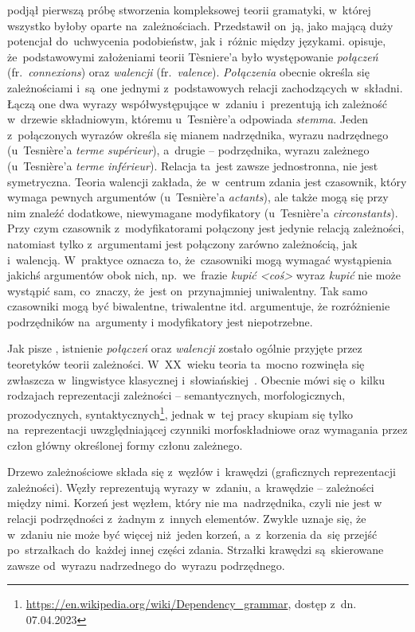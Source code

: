 \documentclass[licencjacka]{pracamgr_Kogni}
\begin{document}
    \citet{Tesniere1959} podjął pierwszą próbę stworzenia kompleksowej teorii gramatyki, w~której wszystko byłoby oparte na~zależnościach.
    Przedstawił on~ją, jako mającą duży potencjał do~uchwycenia podobieństw, jak i~różnic między językami. \citet{Wroblewska2014} opisuje, że~podstawowymi założeniami teorii Tèsniere’a było występowanie \textit{połączeń} (fr.~\textit{connexions}) oraz \textit{walencji} (fr.~\textit{valence}). \textit{Połączenia} obecnie określa się zależnościami i~są~one jednymi z~podstawowych relacji zachodzących w~składni.
    Łączą one dwa wyrazy współwystępujące w~zdaniu i~prezentują ich zależność w~drzewie składniowym, któremu u~Tesnière’a odpowiada \textit{stemma}.
    Jeden z~połączonych wyrazów określa się mianem nadrzędnika, wyrazu nadrzędnego (u~Tesnière’a \textit{terme supérieur}), a~drugie -- podrzędnika, wyrazu zależnego (u~Tesnière’a \textit{terme inférieur}). Relacja ta~jest zawsze jednostronna, nie jest symetryczna.
    Teoria walencji zakłada, że~w~centrum zdania jest czasownik, który wymaga pewnych argumentów (u~Tesnière’a \textit{actants}), ale także mogą się przy nim znaleźć dodatkowe, niewymagane modyfikatory (u~Tesnière’a \textit{circonstants}). Przy czym czasownik z~modyfikatorami połączony jest jedynie relacją zależności, natomiast tylko z~argumentami jest połączony zarówno zależnością, jak i~walencją.
    W~praktyce oznacza to, że~czasowniki mogą wymagać wystąpienia jakichś argumentów obok nich, np.~we~frazie \textit{kupić <coś>} wyraz \textit{kupić} nie może wystąpić sam, co~znaczy, że~jest on~przynajmniej uniwalentny.
    Tak samo czasowniki mogą być biwalentne, triwalentne itd. \citet{Przepiorkowski2017} argumentuje, że rozróżnienie podrzędników na~argumenty i modyfikatory jest niepotrzebne.

    Jak pisze \citet{Wroblewska2014}, istnienie \textit{połączeń} oraz \textit{walencji} zostało ogólnie przyjęte przez teoretyków teorii zależności.
    W~XX~wieku teoria ta~mocno rozwinęła się zwłaszcza w~lingwistyce klasycznej i~słowiańskiej~\citep{Melcuk1988}.
    Obecnie mówi się o~kilku rodzajach reprezentacji zależności -- semantycznych, morfologicznych, prozodycznych, syntaktycznych\footnote{\url{https://en.wikipedia.org/wiki/Dependency_grammar}, dostęp z~dn. 07.04.2023}, jednak w~tej pracy skupiam się tylko na~reprezentacji uwzględniającej czynniki morfoskładniowe oraz wymagania przez człon główny określonej formy członu zależnego.

    Drzewo zależnościowe składa się z~węzłów i~krawędzi (graficznych reprezentacji zależności).
    Węzły reprezentują wyrazy w~zdaniu, a~krawędzie -- zależności między nimi.
    Korzeń jest węzłem, który nie ma~nadrzędnika, czyli nie jest w relacji podrzędności z~żadnym z~innych elementów.
    Zwykle uznaje się, że w~zdaniu nie może być więcej niż~jeden korzeń, a~z~korzenia da~się przejść po~strzałkach do~każdej innej części zdania.
    Strzałki krawędzi są~skierowane zawsze od~wyrazu nadrzednego do~wyrazu podrzędnego.
\end{document}

